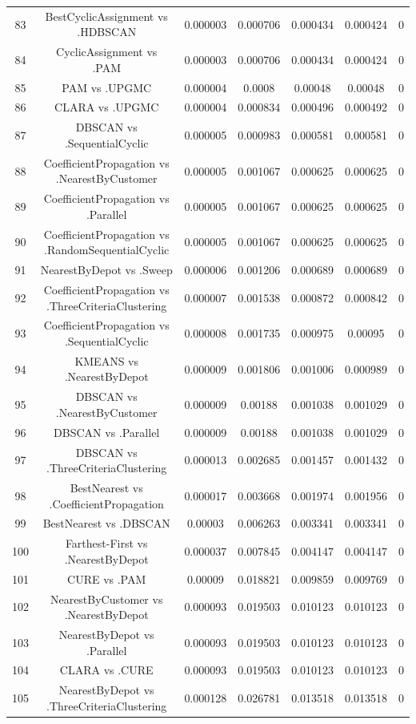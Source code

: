 \documentclass[a4paper,10pt]{article}
\begin{document}
\begin{landscape}
\begin{table}[!htp]
\begin{tabular}{ccccccc}
83&BestCyclicAssignment vs .HDBSCAN&0.000003&0.000706&0.000434&0.000424&0\\
84&CyclicAssignment vs .PAM&0.000003&0.000706&0.000434&0.000424&0\\
85&PAM vs .UPGMC&0.000004&0.0008&0.00048&0.00048&0\\
86&CLARA vs .UPGMC&0.000004&0.000834&0.000496&0.000492&0\\
87&DBSCAN vs .SequentialCyclic&0.000005&0.000983&0.000581&0.000581&0\\
88&CoefficientPropagation vs .NearestByCustomer&0.000005&0.001067&0.000625&0.000625&0\\
89&CoefficientPropagation vs .Parallel&0.000005&0.001067&0.000625&0.000625&0\\
90&CoefficientPropagation vs .RandomSequentialCyclic&0.000005&0.001067&0.000625&0.000625&0\\
91&NearestByDepot vs .Sweep&0.000006&0.001206&0.000689&0.000689&0\\
92&CoefficientPropagation vs .ThreeCriteriaClustering&0.000007&0.001538&0.000872&0.000842&0\\
93&CoefficientPropagation vs .SequentialCyclic&0.000008&0.001735&0.000975&0.00095&0\\
94&KMEANS vs .NearestByDepot&0.000009&0.001806&0.001006&0.000989&0\\
95&DBSCAN vs .NearestByCustomer&0.000009&0.00188&0.001038&0.001029&0\\
96&DBSCAN vs .Parallel&0.000009&0.00188&0.001038&0.001029&0\\
97&DBSCAN vs .ThreeCriteriaClustering&0.000013&0.002685&0.001457&0.001432&0\\
98&BestNearest vs .CoefficientPropagation&0.000017&0.003668&0.001974&0.001956&0\\
99&BestNearest vs .DBSCAN&0.00003&0.006263&0.003341&0.003341&0\\
100&Farthest-First vs .NearestByDepot&0.000037&0.007845&0.004147&0.004147&0\\
101&CURE vs .PAM&0.00009&0.018821&0.009859&0.009769&0\\
102&NearestByCustomer vs .NearestByDepot&0.000093&0.019503&0.010123&0.010123&0\\
103&NearestByDepot vs .Parallel&0.000093&0.019503&0.010123&0.010123&0\\
104&CLARA vs .CURE&0.000093&0.019503&0.010123&0.010123&0\\
105&NearestByDepot vs .ThreeCriteriaClustering&0.000128&0.026781&0.013518&0.013518&0\\

\end{tabular}
\end{table}
\end{landscape}
\end{document}
